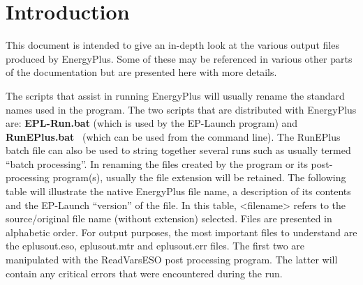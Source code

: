 \chapter{Introduction}\label{introduction}

This document is intended to give an in-depth look at the various output files produced by EnergyPlus. Some of these may be referenced in various other parts of the documentation but are presented here with more details.

The scripts that assist in running EnergyPlus will usually rename the standard names used in the program. The two scripts that are distributed with EnergyPlus are: \textbf{EPL-Run.bat} (which is used by the EP-Launch program) and \textbf{RunEPlus.bat}~ (which can be used from the command line). The RunEPlus batch file can also be used to string together several runs such as usually termed ``batch processing''. In renaming the files created by the program or its post-processing program(s), usually the file extension will be retained. The following table will illustrate the native EnergyPlus file name, a description of its contents and the EP-Launch ``version'' of the file. In this table, \textless{}filename\textgreater{} refers to the source/original file name (without extension) selected. Files are presented in alphabetic order. For output purposes, the most important files to understand are the eplusout.eso, eplusout.mtr and eplusout.err files. The first two are manipulated with the ReadVarsESO post processing program. The latter will contain any critical errors that were encountered during the run.
